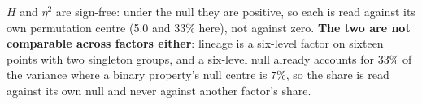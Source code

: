 $H$ and $\eta^2$ are sign-free: under the null they are positive, so each is read against its own permutation centre (5.0 and $33\%$ here), not against zero. \textbf{The two are not comparable across factors either}: lineage is a six-level factor on sixteen points with two singleton groups, and a six-level null already accounts for $33\%$ of the variance where a binary property's null centre is $7\%$, so the share is read against its own null and never against another factor's share.
